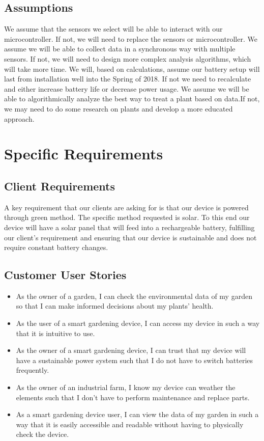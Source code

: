 \documentclass[IEEEtran,letterpaper,10pt,titlepage,fleqn,draftclsnofoot,onecolumn]{article}
\begin{document}
\subsection{Assumptions}

We assume that the sensors we select will be able to interact with our microcontroller. If not, we will need to replace the sensors or microcontroller. We assume we will be able to collect data in a synchronous way with multiple sensors. If not, we will need to design more complex analysis algorithms, which will take more time. We will, based on calculations, assume our battery setup will last from installation well into the Spring of 2018. If not we need to recalculate and either increase battery life or decrease power usage. We assume we will be able to algorithmically analyze the best way to treat a plant based on data.If not, we may need to do some research on plants and develop a more educated approach.  

\clearpage

\section{Specific Requirements}
\subsection{Client Requirements}

A key requirement that our clients are asking for is that our device is powered through green method. The specific method requested is solar. To this end our device will have a solar panel that will feed into a rechargeable battery, fulfilling our client’s requirement and ensuring that our device is sustainable and does not require constant battery changes.

\subsection{Customer User Stories}

\begin{itemize}
  \item As the owner of a garden, I can check the environmental data of my garden so that I can make informed decisions about my plants’ health.
  \item As the user of a smart gardening device, I can access my device in such a way that it is intuitive to use.
  \item As the owner of a smart gardening device, I can trust that my device will have a sustainable power system such that I do not have to switch batteries frequently.
  \item As the owner of an industrial farm, I know my device can weather the elements such that I don’t have to perform maintenance and replace parts.
  \item As a smart gardening device user, I can view the data of my garden in such a way that it is easily accessible and readable without having to physically check the device.
\end{itemize}
\end{document}
